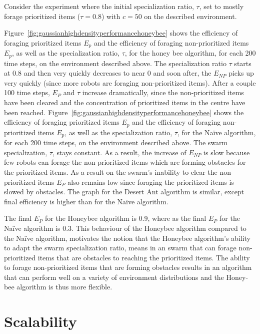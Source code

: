 Consider the experiment where the initial specialization ratio, $\tau$, set to mostly forage prioritized items ($\tau=0.8$) with $c=50$ on the described environment. 

Figure~\ref{fig:gaussianhighdensityperformancehoneybee} shows the efficiency of foraging prioritized items $E_p$ and the efficiency of foraging non-prioritized items $E_p$, as well as the specialization ratio, $\tau$, for the honey bee algorithm, for each 200 time steps, on the environment described above. The specialization ratio $\tau$ starts at 0.8 and then very quickly decreases to near 0 and soon after, the $E_{NP}$ picks up very quickly (since more robots are foraging non-prioritized items). After a couple 100 time steps, $E_{P}$ and $\tau$ increase dramatically, since the non-prioritized items have been cleared and the concentration of prioritized items in the centre have been reached. 
Figure~\ref{fig:gaussianhighdensityperformancehoneybee} shows the efficiency of foraging prioritized items $E_p$ and the efficiency of foraging non-prioritized items $E_p$, as well as the specialization ratio, $\tau$, for the Na\"ive algorithm, for each 200 time steps, on the environment described above. The swarm specialization, $\tau$, stays constant. As a result, the increase of $E_{NP}$ is slow because few robots can forage the non-prioritized items which are forming obstacles for the prioritized items. As a result on the swarm's inability to clear the non-prioritized items $E_P$ also remains low since foraging the prioritized items is slowed by obstacles. The graph for the Desert Ant algorithm is similar, except final efficiency is higher than for the Na\"ive algorithm.

The final $E_P$ for the Honeybee algorithm is 0.9, where as the final $E_P$ for the Na\"ive algorithm is 0.3. This behaviour of the Honeybee algorithm compared to the Na\"ive algorithm, motivates the notion that the Honeybee algorithm's ability to adapt the swarm specialization ratio, means in an swarm that can forage non-prioritized items that are obstacles to reaching the prioritized items. The ability to forage non-prioritized items that are forming obstacles results in an algorithm that can perform well on a variety of environment distributions and the Honey-bee algorithm is thus more flexible.


\section{Scalability}
\label{results:scalability}

